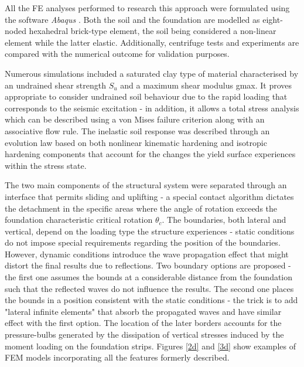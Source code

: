 \documentclass[11pt,a4paper]{report}
\begin{document}
All the FE analyses performed to research this approach were formulated using the software \textit{Abaqus} \cite{manualversion}. Both the soil and the foundation are modelled as eight-noded hexahedral brick-type element, the soil being considered a non-linear element while the latter elastic. Additionally, centrifuge tests and experiments are compared with the numerical outcome for validation purposes.

Numerous simulations included a saturated clay type of material characterised by an undrained shear strength $S_u$ and a maximum shear modulus \gls{gmax}. It proves appropriate to consider undrained soil behaviour due to the rapid loading that corresponds to the seismic excitation - in addition, it allows a total stress analysis which can be described using a von Mises failure criterion along with an associative flow rule. The inelastic soil response was described through an evolution law based on both nonlinear kinematic hardening and isotropic hardening components that account for the changes the yield surface experiences within the stress state.

The two main components of the structural system were separated through an interface that permits sliding and uplifting - a special contact algorithm dictates the detachment in the specific areas where the angle of rotation exceeds the foundation characteristic critical rotation $\theta_c$. The boundaries, both lateral and vertical, depend on the loading type the structure experiences - static conditions do not impose special requirements regarding the position of the boundaries. However, dynamic conditions introduce the wave propagation effect that might distort the final results due to reflections. Two boundary options are proposed - the first one assumes the bounds at a considerable distance from the foundation such that the reflected waves do not influence the results. The second one places the bounds in a position consistent with the static conditions - the trick is to add "lateral infinite elements" that absorb the propagated waves and have similar effect with the first option. The location of the later borders accounts for the pressure-bulbs generated by the dissipation of vertical stresses induced by the moment loading on the foundation strips. Figures \ref{2d} and \ref{3d} show examples of FEM models incorporating all the features formerly described.
\end{document}
